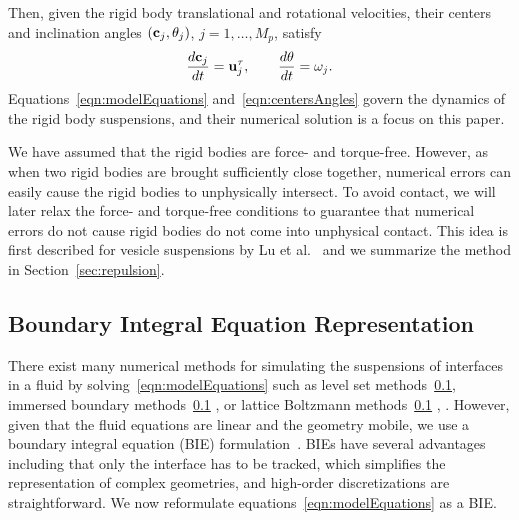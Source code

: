\documentclass[preprint, 10pt]{elsarticle}
\begin{document}
Then, given the rigid body translational and rotational velocities,
their centers and inclination angles $({\mathbf{c}}_j,\theta_j)$,
$j=1,\ldots,M_p$, satisfy
\begin{align}
\begin{split}
  \frac{d{\mathbf{c}}_j}{dt} = {\mathbf{u}}^\tau_j, \qquad 
  \frac{d\theta}{dt} = \omega_j.
\end{split}
\label{eqn:centersAngles}
\end{align}
Equations~\eqref{eqn:modelEquations} and~\eqref{eqn:centersAngles} govern
the dynamics of the rigid body suspensions, and their numerical solution
is a focus on this paper.

We have assumed that the rigid bodies are force- and torque-free.
However, as when two rigid bodies are brought sufficiently close
together, numerical errors can easily cause the rigid bodies to
unphysically intersect.  To avoid contact,  we will later relax the
force- and torque-free conditions to guarantee that numerical errors do
not cause rigid bodies do not come into unphysical contact.  This idea
is first described for vesicle suspensions by Lu et al.~\cite{Lu2017}
and we summarize the method in Section~\ref{sec:repulsion}.  


\subsection{Boundary Integral Equation Representation}
There exist many numerical methods for simulating the suspensions of
interfaces in a fluid by solving~\eqref{eqn:modelEquations} such as
level set methods~\ref{}, immersed boundary methods~\ref{}
, or lattice Boltzmann
methods~\ref{} ,
.  However, given that the fluid
equations are linear and the geometry mobile, we use a boundary integral
equation (BIE) formulation~\cite{Pozrikidis1992}.  BIEs have several
advantages including that only the interface has to be tracked, which
simplifies the representation of complex geometries, and high-order
discretizations are straightforward.  We now reformulate
equations~\eqref{eqn:modelEquations} as a BIE.
\end{document}
